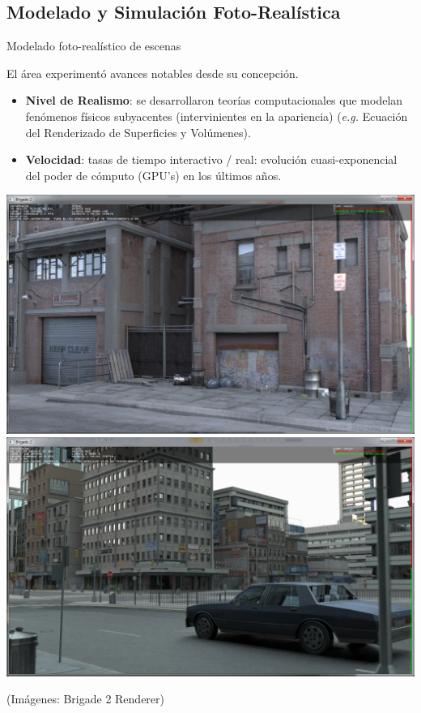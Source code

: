 \documentclass[spanish]{beamer}
\begin{document}
\subsection{Modelado y Simulación Foto-Realística}
\begin{frame}{Modelado foto-realístico de escenas}

El área experimentó avances notables desde su concepción.
\begin{block}{}
\begin{itemize}
\item \textbf{Nivel de Realismo}: se desarrollaron teorías computacionales que modelan fenómenos físicos subyacentes (intervinientes en la apariencia) ({\it e.g.} Ecuación del Renderizado de Superficies y Volúmenes).
\item \textbf{Velocidad}: tasas de tiempo interactivo / real: evolución cuasi-exponencial del poder de cómputo (GPU's) en los últimos años.
\end{itemize}
\end{block}

\end{frame}

\begin{frame}

\includegraphics[scale = 0.18]{../figures/hd1.png}
\includegraphics[scale = 0.18]{../figures/blinn5ed.png}

(Imágenes: Brigade 2 Renderer)


\end{frame}
\end{document}
